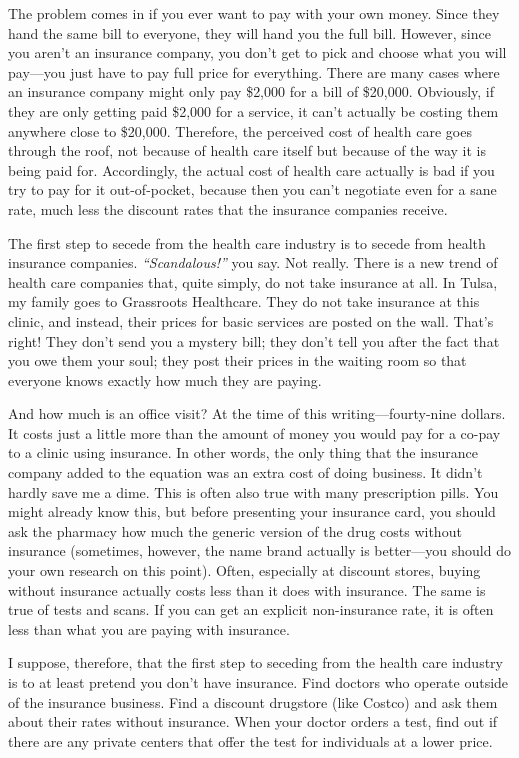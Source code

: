 The problem comes in if you ever want to pay with your own money. Since
they hand the same bill to everyone, they will hand you the full bill.
However, since you aren't an insurance company, you
don't get to pick and choose what you will pay---you
just have to pay full price for everything. There are many cases where
an insurance company might only pay \$2,000 for a bill of \$20,000.
Obviously, if they are only getting paid \$2,000 for a service, it
can't actually be costing them anywhere close to \$20,000. Therefore,
the perceived cost of health care goes through the roof, not because of
health care itself but because of the way it is being paid for. Accordingly, the
actual cost of health care actually is bad if you try to pay for it
out-of-pocket, because then you can't negotiate even for a sane rate, much
less the discount rates that the insurance companies receive.

The first step to secede from the health care industry is to secede from
health insurance companies.
\textit{``Scandalous!''}
you say. Not really.
There is a new trend of health care companies that, quite simply, do
not take insurance at all. In Tulsa, my family goes to Grassroots Healthcare.  They do not take insurance at this clinic, and instead,
their prices for basic services are posted on the wall. 
That's right! They don't send you a mystery bill; they
don't tell you after the fact that you owe them your
soul; they post their prices in the waiting room so that everyone knows
exactly how much they are paying.

And how much is an office visit?  At the time of this writing---fourty-nine dollars. It costs just a little more
than the amount of money you would pay for a co-pay to a clinic using insurance. In other
words, the only thing that the insurance company added to the equation
was an extra cost of doing business. It didn't hardly save me
a dime. This is often also true with many prescription pills.
You might already know
this, but before presenting your insurance card, you should ask the
pharmacy how much the generic version of the drug costs without
insurance (sometimes, however, the name brand actually is better---you should
do your own research on this point). 
Often, especially at discount stores, buying without insurance 
actually costs less than
it does with insurance.  The same is true of tests and scans. If
you can get an explicit non-insurance rate, it is often less than what you are
paying with insurance.

I suppose, therefore, that the
first step to seceding from the health care industry is to at least
pretend you don't have insurance. Find doctors who
operate outside of the insurance business. Find a discount drugstore
(like Costco) and ask them about their rates without insurance. When
your doctor orders a test, find out if there are any private centers
that offer the test for individuals at a lower price. 

